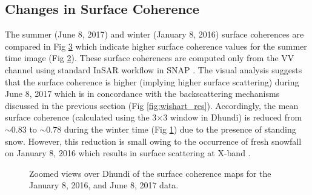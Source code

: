 \documentclass[12pt]{elsarticle}
\numberwithin{equation}{section}
\numberwithin{figure}{section}
\numberwithin{table}{section}
\begin{document}
\subsection{Changes in Surface Coherence}
The summer (June 8, 2017) and winter (January 8, 2016) surface coherences are compared in Fig \ref{fig:coh_res} which indicate higher surface coherence values for the summer time image (Fig \ref{subfig:coh_jun}). These surface coherences are computed only from the VV channel using standard InSAR workflow in SNAP \citep{ESA2019}. The visual analysis suggests that the surface coherence is higher (implying higher surface scattering) during June 8, 2017 which is in concordance with the backscattering mechanisms discussed in the previous section (Fig \ref{fig:wishart_res}). Accordingly, the mean surface coherence (calculated using the 3$\times$3 window in Dhundi) is reduced from $\sim0.83$ to $\sim0.78$ during the winter time (Fig \ref{subfig:coh_jan}) due to the presence of standing snow. However, this reduction is small owing to the occurrence of fresh snowfall on January 8, 2016 which results in surface scattering at X-band \citep{Leinss2014}. 

\begin{figure}[!ht]
    \centering
    \begin{subfigure}[t]{\textwidth}
        \caption{}
        \label{subfig:coh_jan}
    \end{subfigure}
    \begin{subfigure}[t]{\textwidth}
        \caption{}
        \label{subfig:coh_jun}
    \end{subfigure}
    \caption{Zoomed views over Dhundi of the surface coherence maps for the  January 8, 2016, and  June 8, 2017 data.}
    \label{fig:coh_res}
\end{figure}
\FloatBarrier
\end{document}
